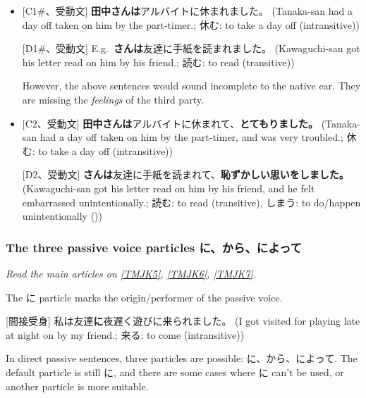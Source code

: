 \documentclass[../nihongo-gakushuu-kyouzai.tex]{subfiles}
\begin{document}
\begin{itemize}
    \item{} [C1\#、受動文] \textbf{田中さんは}アルバイトに休まれました。 (Tanaka-san had a day off taken on him by the part-timer.; 休む: to take a day off (intransitive))

    [D1\#、受動文] E.g.\ \textbf{さんは}友達に手紙を読まれました。 (Kawaguchi-san got his letter read on him by his friend.; 読む: to read (transitive))

    However, the above sentences would sound incomplete to the native ear. They are missing the \emph{feelings} of the third party.

    \item{} [C2、受動文] \textbf{田中さんは}アルバイトに休まれて、\textbf{とてもりました。} (Tanaka-san had a day off taken on him by the part-timer, and was very troubled.; 休む: to take a day off (intransitive))

    [D2、受動文] \textbf{さんは}友達に手紙を読まれて、\textbf{恥ずかしい思いをしました。} (Kawaguchi-san got his letter read on him by his friend, and he felt embarrassed unintentionally.; 読む: to read (transitive), しまう: to do/happen unintentionally (\aux))

\end{itemize}


\subsubsection{The three passive voice particles に、から、によって} \label{sec:tmjk-5-6-7-passive-voice-particles}
\emph{Read the main articles on \href{https://www.tomojuku.com/blog/passive/passive-11/}{[TMJK5]}, \href{https://www.tomojuku.com/blog/passive/passive-10/}{[TMJK6]}, \href{https://www.tomojuku.com/blog/passive/passive-12/}{[TMJK7]}.}

The に particle marks the origin/performer of the passive voice. 

[間接受身] 私は友達\textbf{に}夜遅く遊びに来られました。 (I got visited for playing late at night on by my friend.; 来る: to come (intransitive))

In direct passive sentences, three particles are possible: に、から、によって. The default particle is still に, and there are some cases where に can't be used, or another particle is more suitable.
\end{document}
